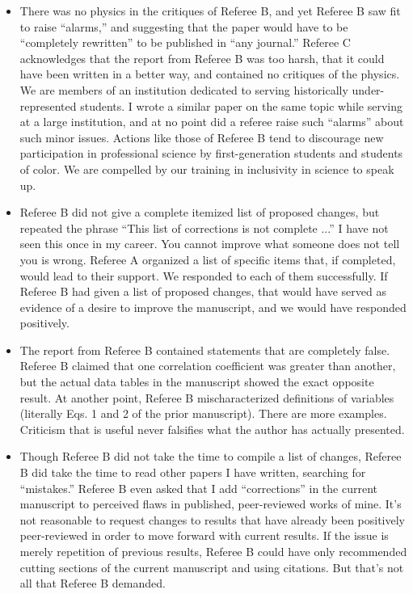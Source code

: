 \documentclass[12pt]{article}
\begin{document}
\begin{itemize}
\item There was no physics in the critiques of Referee B, and yet Referee B saw fit to raise ``alarms,'' and suggesting that the paper would have to be ``completely rewritten'' to be published in ``any journal.''  Referee C acknowledges that the report from Referee B was too harsh, that it could have been written in a better way, and contained no critiques of the physics.  We are members of an institution dedicated to serving historically under-represented students.  I wrote a similar paper on the same topic while serving at a large institution, and at no point did a referee raise such ``alarms'' about such minor issues.  Actions like those of Referee B tend to discourage new participation in professional science by first-generation students and students of color.  We are compelled by our training in inclusivity in science to speak up.
\item Referee B did not give a complete itemized list of proposed changes, but repeated the phrase ``This list of corrections is not complete ...'' I have not seen this once in my career.  You cannot improve what someone does not tell you is wrong.  Referee A organized a list of specific items that, if completed, would lead to their support.  We responded to each of them successfully.  If Referee B had given a list of proposed changes, that would have served as evidence of a desire to improve the manuscript, and we would have responded positively.
\item The report from Referee B contained statements that are completely false.  Referee B claimed that one correlation coefficient was greater than another, but the actual data tables in the manuscript showed the exact opposite result.  At another point, Referee B mischaracterized definitions of variables (literally Eqs. 1 and 2 of the prior manuscript).  There are more examples.  Criticism that is useful never falsifies what the author has actually presented.
\item Though Referee B did not take the time to compile a list of changes, Referee B did take the time to read other papers I have written, searching for ``mistakes.''  Referee B even asked that I add ``corrections'' in the current manuscript to perceived flaws in published, peer-reviewed works of mine.  It's not reasonable to request changes to results that have already been positively peer-reviewed in order to move forward with current results.  If the issue is merely repetition of previous results, Referee B could have only recommended cutting sections of the current manuscript and using citations.  But that's not all that Referee B demanded.
\end{itemize}
\end{document}
